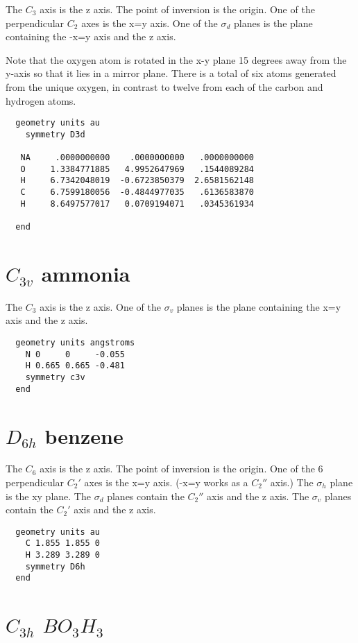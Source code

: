 The $C_3$ axis is the z axis. The point of inversion is the origin. One of
the perpendicular $C_2$ axes is the x=y axis. One of the $\sigma_d$ planes
is the plane containing the -x=y axis and the z axis.

  Note that the oxygen atom is rotated in the x-y plane 15
  degrees away from the y-axis so that it lies in a mirror
  plane.  There is a total of six atoms generated from the
  unique oxygen, in contrast to twelve from each of the carbon
  and hydrogen atoms.

\begin{verbatim}
  geometry units au
    symmetry D3d

   NA     .0000000000    .0000000000   .0000000000
   O     1.3384771885   4.9952647969   .1544089284
   H     6.7342048019  -0.6723850379  2.6581562148
   C     6.7599180056  -0.4844977035   .6136583870
   H     8.6497577017   0.0709194071   .0345361934

  end
\end{verbatim}

  \section{\protect$C_{3v}$ ammonia}

The $C_3$ axis is the z axis. One of the $\sigma_v$ planes is the 
plane containing the x=y axis and the z axis.

\begin{verbatim}
  geometry units angstroms
    N 0     0     -0.055 
    H 0.665 0.665 -0.481 
    symmetry c3v
  end
\end{verbatim}

  \section{\protect$D_{6h}$ benzene}

The $C_6$ axis is the z axis.  The point of inversion is the origin.  One
of the 6 perpendicular $C_2'$ axes is the x=y axis. (-x=y works as a 
$C_2''$ axis.)  The $\sigma_h$ plane is the xy plane.  The $\sigma_d$ 
planes contain the $C_2''$ axis and the z axis.  The $\sigma_v$ planes 
contain the $C_2'$ axis and the z axis.

\begin{verbatim}
  geometry units au
    C 1.855 1.855 0 
    H 3.289 3.289 0 
    symmetry D6h
  end
\end{verbatim}

  \section{\protect$C_{3h}$ \protect$BO_3H_3$}

